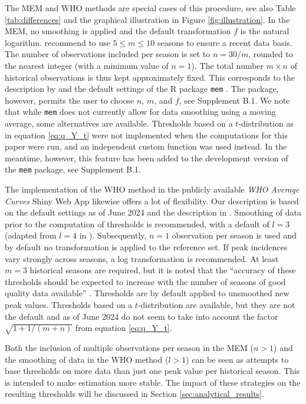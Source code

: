 \documentclass[12pt]{article}
\begin{document}
\noindent The MEM and WHO methods are special cases of this procedure, see also Table \ref{tab:differences} and the graphical illustration in Figure \ref{fig:illustration}. In the MEM, no smoothing is applied and the default transformation $f$ is the natural logarithm.  \cite{Vega2015} recommend to use $5 \leq m \leq 10$ seasons to ensure a recent data basis. The number of observations included per season is set to $n = 30/m$, rounded to the nearest integer (with a minimum value of $n = 1$). The total number $m \times n$ of historical observations is thus kept approximately fixed. This corresponds to the description by \cite{Vega2015} and the default settings of the R package \texttt{mem} \citep{Lozano2020}. The package, however, permits the user to choose $n$, $m$, and $f$, see Supplement B.1. We note that while \texttt{mem} does not currently allow for data smoothing using a moving average, some alternatives are available. Thresholds based on a $t$-distribution as in equation \eqref{eq:q_Y_t} were not implemented when the computations for this paper were run, and an independent custom function was used instead. In the meantime, however, this feature has been added to the development version of the \texttt{mem} package, see Supplement B.1.

The implementation of the WHO method in the publicly available \textit{WHO Average Curves} Shiny Web App \citep{WHO2023} likewise offers a lot of flexibility. Our description is based on the default settings as of June 2024 and the description in \cite{WHO2014}. Smoothing of data prior to the computation of thresholds is recommended, with a default of $l = 3$ (adapted from $l = 4$ in \citealt[p68]{WHO2014}). Subsequently, $n = 1$ observation per season is used and by default no transformation is applied to the reference set. If peak incidences vary strongly across seasons, a log transformation is recommended. At least $m = 3$ historical seasons are required, but it is noted that the ``accuracy of these thresholds should be expected to increase with the number of seasons of good quality data available'' \cite[p22]{WHO2023}. Thresholds are by default applied to unsmoothed new peak values. Thresholds based on a $t$-distribution are available, but they are not the default and as of June 2024 do not seem to take into account the factor $\sqrt{1 + 1/(m + n)}$ from equation \eqref{eq:q_Y_t}.


Both the inclusion of multiple observations per season in the MEM ($n > 1$) and the smoothing of data in the WHO method ($l > 1$) can be seen as attempts to base thresholds on more data than just one peak value per historical season. This is intended to make estimation more stable. The impact of these strategies on the resulting thresholds will be discussed in Section \ref{sec:analytical_results}.
\end{document}
